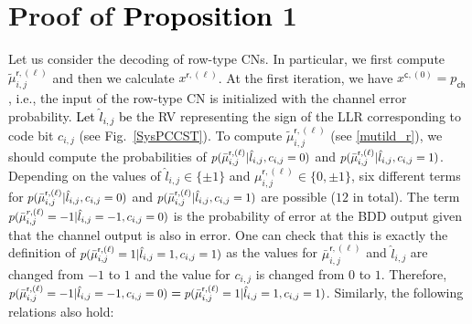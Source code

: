 \documentclass[journal]{IEEEtran}
\newcommand{\mep}{{x}}
\newcommand{\row}{\mathsf{r}}
\newcommand{\col}{\mathsf{c}}
\newcommand{\mut}{\tilde{\mu}}
\newcommand{\GL}{\textcolor{black}}
\newcommand{\AG}{\textcolor{black}}
\newcommand{\AGc}{\textcolor{black}}
\newcommand\scalemath[2]{\scalebox{#1}{\mbox{\ensuremath{\displaystyle #2}}}}   %
\begin{document}
\section{Proof of \GL{Proposition} 1} \label{APP1}
Let us consider the decoding of row-type CNs. In particular, we first compute $\mut_{i,j}^{\row,(\ell )}$ and then we calculate $\mep^{\row,(\ell)}$. At the first iteration, we have $\mep^{\col,(0)}=p_\mathsf{ch}$, i.e., the input of the row-type CN is initialized with the channel error probability.  
\AG{Let $\hat l_{i,j}$ be}  the RV %
representing the sign of the LLR corresponding to code bit $c_{i,j}$ (see Fig.~\ref{SysPCCST}). To compute $\tilde \mu _{i,j}^{\row,(\ell )}$ (see \eqref{mutild_r}), we should compute the probabilities of $\scalemath{0.9}{p ({\bar \mu _{i,j}^{\row,(\ell )}|{\hat l_{i,j}},{c_{i,j}} = 0} )}$ and $\scalemath{0.9}{p( {\bar \mu _{i,j}^{\row,(\ell )}|{\hat l_{i,j}},{c_{i,j}} = 1})}$.  
Depending on the values of $\hat l_{i,j} \in \{\pm 1\}$ and $\mu _{i,j}^{\row,(\ell )} \in \{0, \pm 1\}$, six different terms for $\scalemath{0.9}{p( {\bar \mu _{i,j}^{\row,(\ell )}|{\hat l_{i,j}},{c_{i,j}} = 0} )}$ and $\scalemath{0.9}{p( {\bar \mu _{i,j}^{\row,(\ell )}|{\hat l_{i,j}},{c_{i,j}} = 1})}$ are possible ($12$ in total). The term $\scalemath{0.9}{p( {\bar \mu _{i,j}^{r,(\ell )}=-1|{\hat l_{i,j}=-1},{c_{i,j}} = 0} )}$ is the probability of error at the BDD output given that the channel output is also in error. One can check that this is exactly the definition of $\scalemath{0.9}{p( {\bar \mu _{i,j}^{\row,(\ell )}=1|{\hat l_{i,j}=1},{c_{i,j}} = 1} )}$
 as the values for $\bar \mu _{i,j}^{\row,(\ell )}$ and $\hat l_{i,j}$ are changed from $-1$ to $1$ and the value for $c_{i,j}$ is changed from $0$ to $1$. Therefore, $\scalemath{0.9}{p( {\bar \mu _{i,j}^{\row,(\ell )}=-1|{\hat l_{i,j}=-1},{c_{i,j}} = 0} )}=\scalemath{0.9}{p( {\bar \mu _{i,j}^{\row,(\ell )}=1|{\hat l_{i,j}=1},{c_{i,j}} = 1} )}$. Similarly, the following relations also hold: \\
\end{document}
